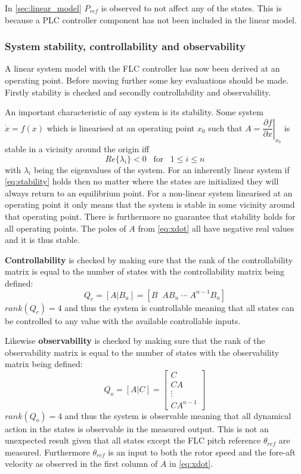 In \cref{sec:linear_model} $ P_{ref} $ is observed to not affect any of the states. This is because a PLC controller component has not been included in the linear model.

\subsubsection{System stability, controllability and observability}
A linear system model with the FLC controller has now been derived at an operating point. Before moving further some key evaluations should be made. Firstly stability is checked and secondly controllability and observability.

\medskip
An important characteristic of any system is its stability. Some system $ \dot x = f(x) $ which is linearised at an operating point $ x_0 $ such that $ A = \left. \dfrac{\partial f}{\partial x} \right| _{x_0} $ is stable in a vicinity around the origin iff
\begin{equation}\label{eq:stability}
	Re\{\lambda_i\} < 0 \;\;\; \text{for} \;\;\; 1 \leq i \leq n
\end{equation}
with $ \lambda_i $ being the eigenvalues of the system. For an inherently linear system if \cref{eq:stability} holds then no matter where the states are initialized they will always return to an equilibrium point. For a non-linear system linearised at an operating point it only means that the system is stable in some vicinity around that operating point. There is furthermore no guarantee that stability holds for all operating points. The poles of $ A $ from \cref{eq:xdot} all have negative real values and it is thus stable.

\smallskip
\textbf{Controllability} is checked by making sure that the rank of the controllability matrix is equal to the number of states with the controllability matrix being defined:
\begin{equation}\label{eq:controllability}
	Q_c = [A|B_u] = [B \;\; AB_u \; \cdots \; A^{n-1}B_u]
\end{equation}
$ rank(Q_c) = 4 $ and thus the system is controllable meaning that all states can be controlled to any value with the available controllable inputs.

\smallskip
Likewise \textbf{observability} is checked by making sure that the rank of the observability matrix is equal to the number of states with the observability matrix being defined:
\begin{equation}\label{eq:observability}
	Q_o = [A|C] = \begin{bmatrix}
		C \\ CA \\ \vdots \\ CA^{n-1}
	\end{bmatrix}
\end{equation}
$ rank(Q_o) = 4 $ and thus the system is observable meaning that all dynamical action in the states is observable in the measured output. This is not an unexpected result given that all states except the FLC pitch reference $ \theta_{ref} $ are measured. Furthermore $ \theta_{ref} $ is an input to both the rotor speed and the fore-aft velocity as observed in the first column of $ A $ in \cref{eq:xdot}.



